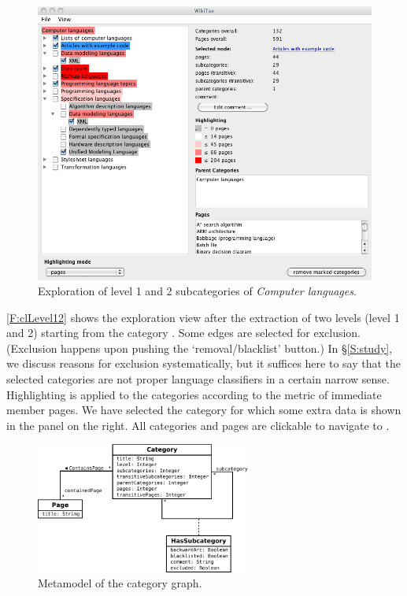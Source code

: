 
\begin{figure}[t!]
\begin{center}
\includegraphics[width=.84\textwidth]{figures/clLevel12.png}
\end{center}
\vspace{-66\in}
\caption{Exploration of level 1 and 2 subcategories of \emph{Computer languages}.}
\label{F:clLevel12}
\vspace{-42\in}
\end{figure}


\autoref{F:clLevel12} shows the \WikiTax{} exploration view after the
extraction of two levels (level 1 and 2) starting from the category
. Some edges are selected for
exclusion. (Exclusion happens upon pushing the
`removal/blacklist' button.)  In \S\ref{S:study}, we discuss reasons
for exclusion systematically, but it suffices here to say that the
selected categories are not proper language classifiers in a certain
narrow sense. Highlighting is applied to the categories according to
the metric of immediate member pages. We have selected the category
 for which some extra
data is shown in the panel on the right. All categories and pages are
clickable to navigate to \Wikipedia.


\begin{figure}[ht]
\centering
\includegraphics[width=0.63\textwidth]{../manual/figures/full_schema.pdf} 
\caption{Metamodel of the \WikiTax{} category graph.}
\label{F:metamodel}
\vspace{-42\in}
\end{figure}


